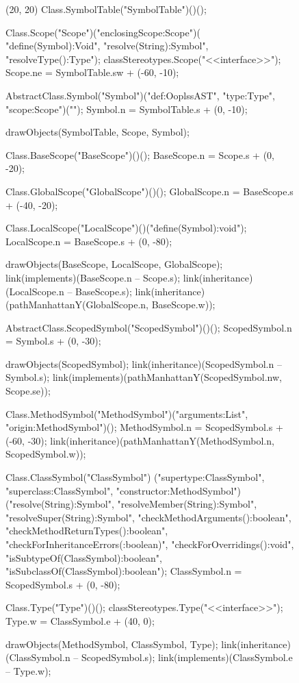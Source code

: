 \begin{figure}[H]
	\centering
	\begin{emp}[classdiag](20, 20)
	Class.SymbolTable("SymbolTable")()();

	Class.Scope("Scope")("enclosingScope:Scope")( "define(Symbol):Void", 
			"resolve(String):Symbol", "resolveType():Type");
	classStereotypes.Scope("<<interface>>");
	Scope.ne = SymbolTable.sw + (-60, -10);

	AbstractClass.Symbol("Symbol")("def:OoplssAST", "type:Type", "scope:Scope")("");
	Symbol.n = SymbolTable.s + (0, -10);

	drawObjects(SymbolTable, Scope, Symbol);

	Class.BaseScope("BaseScope")()();
	BaseScope.n = Scope.s + (0, -20);

	Class.GlobalScope("GlobalScope")()();
	GlobalScope.n = BaseScope.s + (-40, -20);

	Class.LocalScope("LocalScope")()("define(Symbol):void");
	LocalScope.n = BaseScope.s + (0, -80);

	drawObjects(BaseScope, LocalScope, GlobalScope);
	link(implements)(BaseScope.n -- Scope.s);
	link(inheritance)(LocalScope.n -- BaseScope.s);
	link(inheritance)(pathManhattanY(GlobalScope.n, BaseScope.w));

	AbstractClass.ScopedSymbol("ScopedSymbol")()();
	ScopedSymbol.n  = Symbol.s + (0, -30);

	drawObjects(ScopedSymbol);
	link(inheritance)(ScopedSymbol.n -- Symbol.s);
	link(implements)(pathManhattanY(ScopedSymbol.nw, Scope.se));

	Class.MethodSymbol("MethodSymbol")("arguments:List", "origin:MethodSymbol")();
	MethodSymbol.n = ScopedSymbol.s + (-60, -30);
	link(inheritance)(pathManhattanY(MethodSymbol.n, ScopedSymbol.w));

	Class.ClassSymbol("ClassSymbol")
		("supertype:ClassSymbol", "superclass:ClassSymbol", "constructor:MethodSymbol")
		("resolve(String):Symbol", "resolveMember(String):Symbol",
		"resolveSuper(String):Symbol", 
		"checkMethodArguments():boolean", "checkMethodReturnTypes():boolean",
		"checkForInheritanceErrors(:boolean)", "checkForOverridings():void",
		"isSubtypeOf(ClassSymbol):boolean", "isSubclassOf(ClassSymbol):boolean");
	ClassSymbol.n = ScopedSymbol.s + (0, -80);

	Class.Type("Type")()();
	classStereotypes.Type("<<interface>>");
	Type.w = ClassSymbol.e + (40, 0);

	drawObjects(MethodSymbol, ClassSymbol, Type);
	link(inheritance)(ClassSymbol.n -- ScopedSymbol.s);
	link(implements)(ClassSymbol.e -- Type.w);



\end{emp}
\end{figure}
